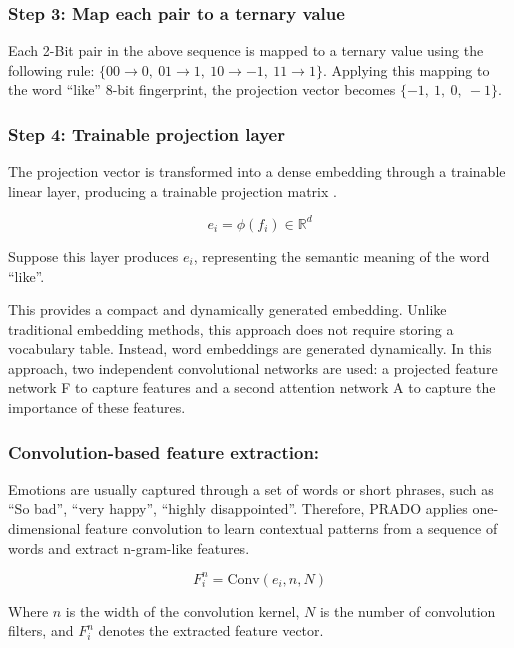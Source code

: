 \subsubsection{Step 3: Map each pair to a ternary value}

Each 2-Bit pair in the above sequence is mapped to a ternary value using the following rule: $\{00 \rightarrow 0,\ 01 \rightarrow 1,\ 10 \rightarrow -1,\ 11 \rightarrow 1\}$. Applying this mapping to the word ``like'' 8-bit fingerprint, the projection vector becomes $\{-1,\ 1,\ 0,\ -1\}$.

\subsubsection{Step 4: Trainable projection layer}
The projection vector is transformed into a dense embedding through a trainable linear layer, producing a trainable projection matrix \cite{ref75}.

\begin{equation}
  e_{i} = \phi(f_{i}) \in \mathbb{R}^{d}
  \label{eq:ch3_3_2}
\end{equation}

Suppose this layer produces $e_{i}$, representing the semantic meaning of the word ``like''.

This provides a compact and dynamically generated embedding. Unlike traditional embedding methods, this approach does not require storing a vocabulary table. Instead, word embeddings are generated dynamically. In this approach, two independent convolutional networks are used: a projected feature network F to capture features and a second attention network A to capture the importance of these features.

\subsubsection{Convolution-based feature extraction:}
Emotions are usually captured through a set of words or short phrases, such as “So bad”, “very happy”, “highly disappointed”. Therefore, PRADO applies one-dimensional feature convolution to learn contextual patterns from a sequence of words and extract n-gram-like features.

\begin{equation}
  F_{i}^{n} = \text{Conv}(e_{i}, n, N)
  \label{eq:ch3_3_3}
\end{equation}

Where $n$ is the width of the convolution kernel, $N$ is the number of convolution filters, and $F_{i}^{n}$ denotes the extracted feature vector.

